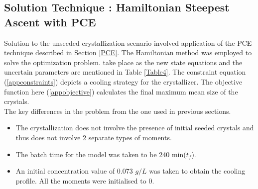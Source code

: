 \documentclass[3p,times,authoryear]{elsarticle}
\begin{document}
\subsection{Solution Technique : Hamiltonian Steepest Ascent with PCE}

Solution to the unseeded crystallization scenario involved application of the PCE technique described in Section \ref{PCE}. The Hamiltonian method was employed to solve the optimization problem. 
 take place as the new state equations and the uncertain parameters are mentioned in Table \ref{Table4}. The constraint equation (\ref{appconstraints}) depicts a cooling strategy for the crystallizer. The objective function here (\ref{appobjective}) calculates the final maximum mean size of the crystals.\\ 
The key differences in the problem from the one used in previous sections.
\begin{itemize}
\item The crystallization does not involve the presence of initial seeded crystals and thus does not involve 2 separate types of moments.
\item The batch time for the model was taken to be 240 min($t_{f}$).
\item An initial concentration value of 0.073 $g/L$ was taken to obtain the cooling profile. All the moments were initialised to 0.
\end{itemize}

\end{document}

